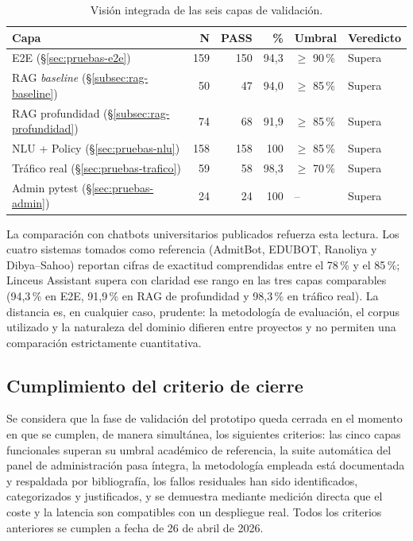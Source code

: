 \begin{table}[hbtp]
\centering
\caption{Visión integrada de las seis capas de validación.}\label{tab:visiongeneral}
\begin{tabular}{lrrrll}
\hline
\textbf{Capa} & \textbf{N} & \textbf{PASS} & \textbf{\%} & \textbf{Umbral} & \textbf{Veredicto} \\
\hline
E2E (\S\ref{sec:pruebas-e2e}) & 159 & 150 & 94,3 & $\geq$ 90\,\% \cite{braun2017evaluating} & Supera \\
RAG \textit{baseline} (\S\ref{subsec:rag-baseline}) & 50 & 47 & 94,0 & $\geq$ 85\,\% \cite{lewis2020retrieval} & Supera \\
RAG profundidad (\S\ref{subsec:rag-profundidad}) & 74 & 68 & 91,9 & $\geq$ 85\,\% \cite{es2024ragas} & Supera \\
NLU + Policy (\S\ref{sec:pruebas-nlu}) & 158 & 158 & 100 & $\geq$ 85\,\% \cite{bocklisch2020diet} & Supera \\
Tráfico real (\S\ref{sec:pruebas-trafico}) & 59 & 58 & 98,3 & $\geq$ 70\,\% \cite{casas2020trends} & Supera \\
Admin pytest (\S\ref{sec:pruebas-admin}) & 24 & 24 & 100 & -- & Supera \\
\hline
\end{tabular}
\end{table}

La comparación con chatbots universitarios publicados refuerza esta lectura. Los cuatro sistemas tomados como referencia (AdmitBot, EDUBOT, Ranoliya y Dibya--Sahoo) reportan cifras de exactitud comprendidas entre el 78\,\% y el 85\,\%; Linceus Assistant supera con claridad ese rango en las tres capas comparables (94,3\,\% en E2E, 91,9\,\% en RAG de profundidad y 98,3\,\% en tráfico real). La distancia es, en cualquier caso, prudente: la metodología de evaluación, el corpus utilizado y la naturaleza del dominio difieren entre proyectos y no permiten una comparación estrictamente cuantitativa.

\subsection{Cumplimiento del criterio de cierre}\label{subsec:pruebas-cierre}

Se considera que la fase de validación del prototipo queda cerrada en el momento en que se cumplen, de manera simultánea, los siguientes criterios: las cinco capas funcionales superan su umbral académico de referencia, la suite automática del panel de administración pasa íntegra, la metodología empleada está documentada y respaldada por bibliografía, los fallos residuales han sido identificados, categorizados y justificados, y se demuestra mediante medición directa que el coste y la latencia son compatibles con un despliegue real. Todos los criterios anteriores se cumplen a fecha de 26 de abril de 2026.


